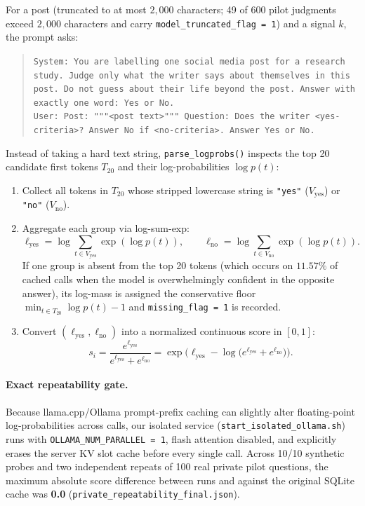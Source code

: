 \documentclass[11pt,a4paper]{article}
\begin{document}
For a post (truncated to at most $2{,}000$ characters; 49 of 600 pilot judgments exceed $2{,}000$ characters and carry \texttt{model\_truncated\_flag = 1}) and a signal $k$, the prompt asks:
\begin{quote}
\small
\texttt{System: You are labelling one social media post for a research study. Judge only what the writer says about themselves in this post. Do not guess about their life beyond the post. Answer with exactly one word: Yes or No.}\\
\texttt{User: Post: """<post text>""" Question: Does the writer <yes-criteria>? Answer No if <no-criteria>. Answer Yes or No.}
\end{quote}

Instead of taking a hard text string, \texttt{parse\_logprobs()} inspects the top 20 candidate first tokens $T_{20}$ and their log-probabilities $\log p(t)$:
\begin{enumerate}[nosep]
\item Collect all tokens in $T_{20}$ whose stripped lowercase string is \texttt{"yes"} ($V_{\mathrm{yes}}$) or \texttt{"no"} ($V_{\mathrm{no}}$).
\item Aggregate each group via log-sum-exp:
\begin{equation}
\ell_{\mathrm{yes}} = \log \sum_{t \in V_{\mathrm{yes}}} \exp(\log p(t)), \qquad
\ell_{\mathrm{no}} = \log \sum_{t \in V_{\mathrm{no}}} \exp(\log p(t)).
\end{equation}
If one group is absent from the top 20 tokens (which occurs on $11.57\%$ of cached calls when the model is overwhelmingly confident in the opposite answer), its log-mass is assigned the conservative floor $\min_{t \in T_{20}} \log p(t) - 1$ and \texttt{missing\_flag = 1} is recorded.
\item Convert $(\ell_{\mathrm{yes}}, \ell_{\mathrm{no}})$ into a normalized continuous score in $[0,1]$:
\begin{equation}
s_i = \frac{e^{\ell_{\mathrm{yes}}}}{e^{\ell_{\mathrm{yes}}} + e^{\ell_{\mathrm{no}}}}
= \exp\!\Big(\ell_{\mathrm{yes}} - \log\big(e^{\ell_{\mathrm{yes}}} + e^{\ell_{\mathrm{no}}}\big)\Big).
\end{equation}
\end{enumerate}

\paragraph{Exact repeatability gate.}
Because llama.cpp/Ollama prompt-prefix caching can slightly alter floating-point log-probabilities across calls, our isolated service (\texttt{start\_isolated\_ollama.sh}) runs with \texttt{OLLAMA\_NUM\_PARALLEL = 1}, flash attention disabled, and explicitly erases the server KV slot cache before every single call. Across 10/10 synthetic probes and two independent repeats of 100 real private pilot questions, the maximum absolute score difference between runs and against the original SQLite cache was \textbf{0.0} (\texttt{private\_repeatability\_final.json}).
\end{document}

